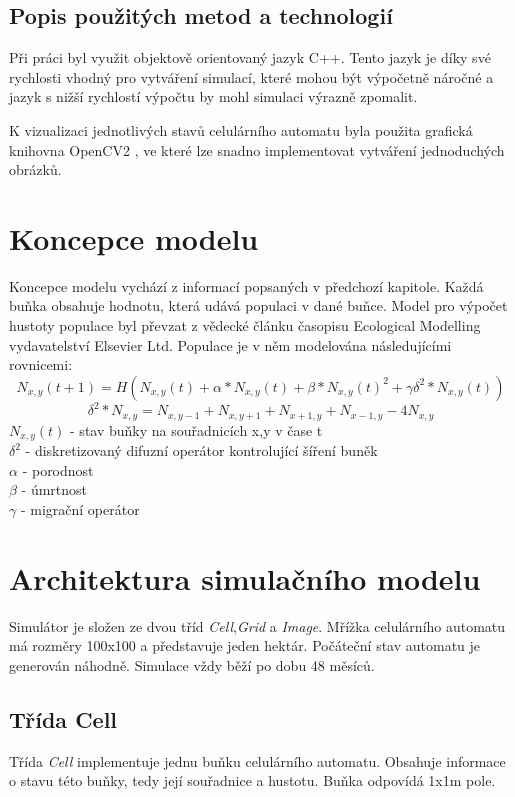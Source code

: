 \documentclass[a4paper,11pt]{article}
\begin{document}
\subsection{Popis použitých metod a technologií}
Při práci byl využit objektově orientovaný jazyk C++. Tento jazyk je díky své rychlosti vhodný pro vytváření simulací, které mohou být výpočetně náročné a jazyk s nižší rychlostí výpočtu by mohl simulaci výrazně zpomalit. 

K vizualizaci jednotlivých stavů celulárního automatu byla použita grafická knihovna OpenCV2 \cite{opencv2}, ve které lze snadno implementovat vytváření jednoduchých obrázků. 

\newpage

\section{Koncepce modelu}
Koncepce modelu vychází z informací popsaných v předchozí kapitole. Každá buňka obsahuje hodnotu, která udává populaci v dané buňce. Model pro výpočet hustoty populace byl převzat z vědecké článku \cite{OurCA} časopisu Ecological Modelling vydavatelství Elsevier Ltd. Populace je v něm modelována následujícími rovnicemi:
\begin{equation}
N_{x,y}(t+1) = H(N_{x,y}(t) + \alpha*N_{x,y}(t) + \beta*N_{x,y}(t)^2 + \gamma\delta^2*N_{x,y}(t))
\end{equation}
\begin{equation}
\delta^2*N_{x,y} = N_{x,y-1} + N_{x,y+1} + N_{x+1,y} + N_{x-1,y} - 4N_{x,y}
\end{equation}
\( N_{x,y}(t) \) - stav buňky na souřadnicích x,y v čase t\ \\
\( \delta^2 \) - diskretizovaný difuzní operátor kontrolující šíření buněk \\
\( \alpha \) - porodnost \\
\( \beta \) - úmrtnost \\
\( \gamma \) - migrační operátor\\


\section{Architektura simulačního modelu}
Simulátor je složen ze dvou tříd \emph{Cell},\emph{Grid} a \emph{Image}. Mřížka celulárního automatu má rozměry 100x100 a představuje jeden hektár. Počáteční stav automatu je generován náhodně. Simulace vždy běží po dobu 48 měsíců.

\subsection{Třída Cell}
Třída \emph{Cell} implementuje jednu buňku celulárního automatu. Obsahuje informace o stavu této buňky, tedy její souřadnice a hustotu. Buňka odpovídá 1x1m pole.
\end{document}
